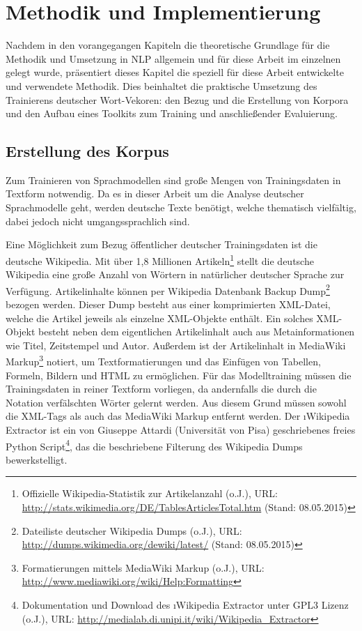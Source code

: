 \chapter{Methodik und Implementierung}\label{c.implementierung}
Nachdem in den vorangegangen Kapiteln die theoretische Grundlage für die Methodik und Umsetzung in NLP allgemein und für diese Arbeit im einzelnen gelegt wurde, präsentiert dieses Kapitel die speziell für diese Arbeit entwickelte und verwendete Methodik. Dies beinhaltet die praktische Umsetzung des Trainierens deutscher Wort-Vekoren: den Bezug und die Erstellung von Korpora und den Aufbau eines Toolkits zum Training und anschließender Evaluierung.

\section{Erstellung des Korpus}\label{s.korpuserstellung}
Zum Trainieren von Sprachmodellen sind große Mengen von Trainingsdaten in Textform notwendig. Da es in dieser Arbeit um die Analyse deutscher Sprachmodelle geht, werden deutsche Texte benötigt, welche thematisch vielfältig, dabei jedoch nicht umgangssprachlich sind.

Eine Möglichkeit zum Bezug öffentlicher deutscher Trainingsdaten ist die deutsche Wikipedia. Mit über 1,8 Millionen Artikeln\footnote{Offizielle Wikipedia-Statistik zur Artikelanzahl (o.J.), URL: \url{http://stats.wikimedia.org/DE/TablesArticlesTotal.htm} (Stand: 08.05.2015)} stellt die deutsche Wikipedia eine große Anzahl von Wörtern in natürlicher deutscher Sprache zur Verfügung. Artikelinhalte können per Wikipedia Datenbank Backup Dump\footnote{Dateiliste deutscher Wikipedia Dumps (o.J.), URL: \url{http://dumps.wikimedia.org/dewiki/latest/} (Stand: 08.05.2015)} bezogen werden. Dieser Dump besteht aus einer komprimierten XML-Datei, welche die Artikel jeweils als einzelne XML-Objekte enthält. Ein solches XML-Objekt besteht neben dem eigentlichen Artikelinhalt auch aus Metainformationen wie Titel, Zeitstempel und Autor. Außerdem ist der Artikelinhalt in MediaWiki Markup\footnote{Formatierungen mittels MediaWiki Markup (o.J.), URL: \url{http://www.mediawiki.org/wiki/Help:Formatting}} notiert, um Textformatierungen und das Einfügen von Tabellen, Formeln, Bildern und HTML zu ermöglichen. Für das Modelltraining müssen die Trainingsdaten in reiner Textform vorliegen, da andernfalls die durch die Notation verfälschten Wörter gelernt werden. Aus diesem Grund müssen sowohl die XML-Tags als auch das MediaWiki Markup entfernt werden. Der \i{Wikipedia Extractor} ist ein von Giuseppe Attardi (Universität von Pisa) geschriebenes freies Python Script\footnote{Dokumentation und Download des \i{Wikipedia Extractor} unter GPL3 Lizenz (o.J.), URL: \url{http://medialab.di.unipi.it/wiki/Wikipedia_Extractor}}, das die beschriebene Filterung des Wikipedia Dumps bewerkstelligt.

